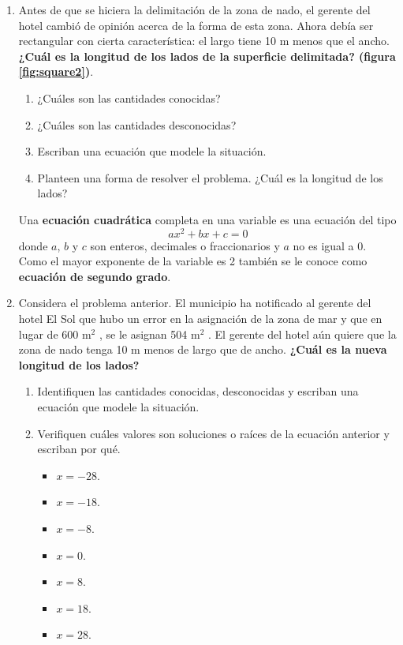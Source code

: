 \documentclass[11pt]{book}
\begin{document}
\begin{enumerate}
  \item Antes de que se hiciera la delimitación de la zona de nado, el gerente del
        hotel cambió de opinión acerca de la forma de esta zona. Ahora debía
        ser rectangular con cierta característica: el largo tiene 10 m menos que
        el ancho. \textbf{¿Cuál es la longitud de los lados de la superficie delimitada?
          (figura \ref{fig:square2})}.\\
        \begin{enumerate}
          \item ¿Cuáles son las cantidades conocidas?
          \item ¿Cuáles son las cantidades desconocidas?
          \item Escriban una ecuación que modele la situación.
          \item Planteen una forma de resolver el problema. ¿Cuál es la longitud de los
                lados?
        \end{enumerate}

        \begin{boxH}
          Una \textbf{ecuación cuadrática} completa en una variable es una ecuación del tipo
          \begin{equation}
            ax^2 + bx + c = 0
          \end{equation}
          donde $a$, $b$ y $c$ son enteros, decimales o fraccionarios y $a$ no es igual a 0. Como el
          mayor exponente de la variable es 2 también se
          le conoce como \textbf{ecuación de segundo grado}.
        \end{boxH}

  \item Considera el problema anterior. El municipio ha
        notificado al gerente del hotel El Sol que hubo un error en la asignación de la zona
        de mar y que en lugar de 600 m$^2$ , se le asignan 504 m$^2$ . El gerente del hotel aún
        quiere que la zona de nado tenga 10 m menos de largo que de ancho. \textbf{¿Cuál es la
          nueva longitud de los lados?}

        \begin{enumerate}
          \item Identifiquen las cantidades conocidas, desconocidas y escriban una ecuación que
                modele la situación.
          \item Verifiquen cuáles valores son soluciones o raíces de la ecuación anterior y escriban
                por qué.
                \begin{itemize}
                  \item $x = -28$.
                  \item $x = -18$.
                  \item $x = -8$.
                  \item $x = 0$.
                  \item $x = 8$.
                  \item $x = 18$.
                  \item $x = 28$.
                \end{itemize}


\end{enumerate}
\end{enumerate}
\end{document}
